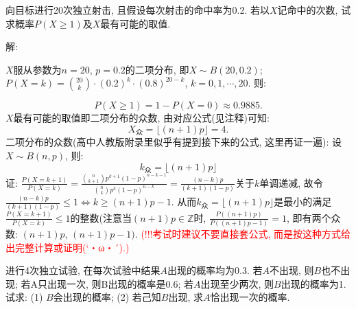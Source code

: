 \documentclass[standard]{ExBook}
\begin{document}
\begin{qitems}
    \begin{bbox}
    \begin{shaded}
        \qitem
向目标进行20次独立射击, 且假设每次射击的命中率为0.2. 若以$X$记命中的次数, 试求概率$P(X \geq 1)$及$X$最有可能的取值.
    \end{shaded}
    \end{bbox}

\vspace{-5em}

    \begin{bbox}
解: 

$X$服从参数为$n=20$, $p=0.2$的二项分布, 即$X\sim B(20,0.2)$; $P(X=k)=\binom{20}{k}\cdot(0.2)^k\cdot(0.8)^{20-k}$, $k=0,1,\cdots,20$. 则:
    \end{bbox}
    
\vspace{-5em}

    \begin{bbox}
$$P(X \geq 1)=1-P(X=0)\approx0.9885.$$
$X$最有可能的取值即二项分布的众数, 由对应公式\textcolor{themeColor}{(见注释)}可知:
$$X_{\text{众}}=\lfloor(n+1)p\rfloor=4.$$
\textcolor{themeColor}{\selectfont {} 二项分布的众数(高中人教版附录里似乎有提到接下来的公式, 这里再证一遍): 设$X\sim B(n,p)$, 则:
$$k_{\text{众}}=\lfloor(n+1)p\rfloor$$
证: $\displaystyle\frac{P(X=k+1)}{P(X=k)}=\frac{\binom{n}{k+1}p^{k+1}(1-p)^{n-k-1}}{\binom{n}{k}p^{k}(1-p)^{n-k}}=\frac{(n-k)p}{(k+1)(1-p)}$关于$k$单调递减, 故令$\displaystyle\frac{(n-k)p}{(k+1)(1-p)} \leq 1 \Longleftrightarrow k \geq (n+1)p-1$. 从而$k_{\text{众}}=\lfloor(n+1)p\rfloor$是最小的满足$\displaystyle\frac{P(X=k+1)}{P(X=k)} \leq 1$的整数(注意当$(n+1)p\in\mathbb{Z}$时, $\frac{P((n+1)p)}{P((n+1)p-1)}=1$, 即有两个众数: $(n+1)p$, $(n+1)p-1)$.} \textcolor{red}{(!!!考试时建议不要直接套公式, 而是按这种方式给出完整计算或证明(`・ω・´).)}
    \end{bbox}

\vspace{-5em}

    \begin{bbox}
    \begin{shaded}
        \qitem
进行4次独立试验, 在每次试验中结果$A$出现的概率均为0.3. 若$A$不出现, 则$B$也不出现; 若A只出现一次, 则B出现的概率是0.6; 若$A$出现至少两次, 则$B$出现的概率为1. 试求: (1) $B$会出现的概率; (2) 若己知$B$出现, 求$A$恰出现一次的概率.
    \end{shaded}
    \end{bbox}

\vspace{-5em}


\end{qitems}
\end{document}
